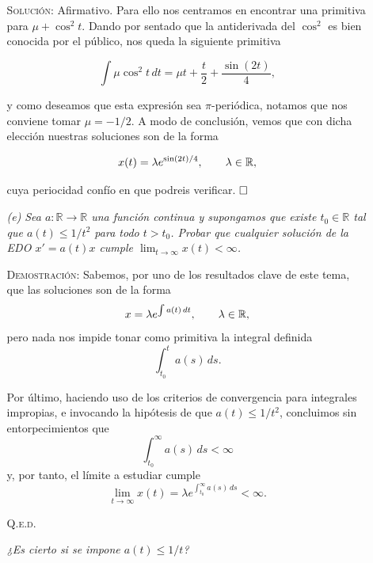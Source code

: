 \documentclass{article}
\begin{document}
\begin{enumerate}
\begin{enumerate}
        \vspace{7px}

        \textsc{Solución}: Afirmativo. Para ello nos centramos en encontrar una primitiva para $\mu + \cos^2t$. Dando por sentado que la antiderivada del $\cos^2$ es bien conocida por el público, nos queda la siguiente primitiva

        \[\int \mu \cos^2t\,dt = \mu t + \frac{t}{2} + \frac{\sin(2t)}{4},\]

        y como deseamos que esta expresión sea $\pi$-periódica, notamos que nos conviene tomar $\mu = -1/2$. A modo de conclusión, vemos que con dicha elección nuestras soluciones son de la forma

        \[x(t) = \lambda e^{\sin(2t)/4}, \hspace{20px} \lambda \in \mathbb{R},\]

        cuya periocidad confío en que podreis verificar. $\hfill\square$

        \vspace{7px}

        \item[\textit{(e)}] \textit{Sea $a : \mathbb{R} \rightarrow \mathbb{R}$ una función continua y supongamos que existe $t_0 \in \mathbb{R}$ tal que $a(t) \leq 1/t^2$ para todo $t > t_0$. Probar que cualquier solución de la EDO $x' = a(t)x$ cumple $\lim_{t \to \infty} x(t) < \infty$.}

        \vspace{7px}

        \textsc{Demostración}: Sabemos, por uno de los resultados clave de este tema, que las soluciones son de la forma \[x = \lambda e ^{\int a(t)\,dt}, \hspace{20px} \lambda \in \mathbb{R},\] pero nada nos impide tonar como primitiva la integral definida \[\int_{t_0}^{t} a(s)\, ds.\]

        Por último, haciendo uso de los criterios de convergencia para integrales impropias, e invocando la hipótesis de que $a(t) \leq 1/t^2$, concluimos sin entorpecimientos que \[\int_{t_0}^{\infty} a(s)\,ds < \infty\] y, por tanto, el límite a estudiar cumple \[\lim_{t \to \infty} x(t) = \lambda e^{\int_{t_0}^{\infty} a(s)\,ds} < \infty.\]

        \hfill{\textsc{Q.e.d.}}

        \vspace{7px}

        \textit{¿Es cierto si se impone $a(t) \leq 1/t$?}


\end{enumerate}
\end{enumerate}
\end{document}
